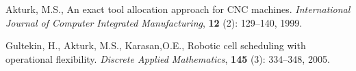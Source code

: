 %
%

\newpage
\pagestyle{plain}

\begin{thebibliography}{99}

 Akturk, M.S., An exact tool allocation approach for CNC machines. {\em International Journal of Computer Integrated Manufacturing}, {\bf 12} (2): 129--140, 1999.

 Gultekin, H., Akturk, M.S., Karasan,O.E., Robotic cell scheduling with operational flexibility. {\em Discrete Applied Mathematics}, {\bf 145} (3): 334--348, 2005.

\end{thebibliography}
